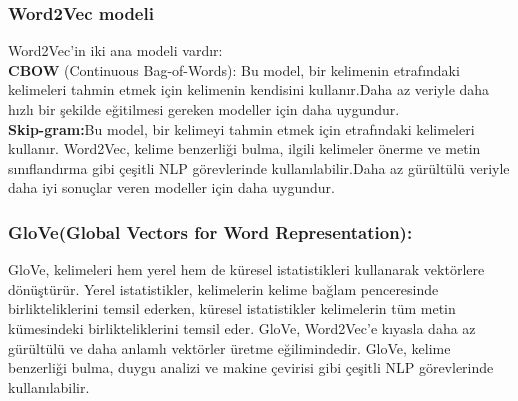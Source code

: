 \documentclass[12pt, a4paper]{article}
\begin{document}
	\subsubsection{Word2Vec modeli}
	Word2Vec'in iki ana modeli vardır:\\
	\textbf{CBOW} (Continuous Bag-of-Words): Bu model, bir kelimenin etrafındaki kelimeleri tahmin etmek için kelimenin kendisini kullanır.Daha az veriyle daha hızlı bir şekilde eğitilmesi gereken modeller için daha uygundur.\\
	\textbf{Skip-gram:}Bu model, bir kelimeyi tahmin etmek için etrafındaki kelimeleri kullanır.
	Word2Vec, kelime benzerliği bulma, ilgili kelimeler önerme ve metin sınıflandırma gibi çeşitli NLP görevlerinde kullanılabilir.Daha az gürültülü veriyle daha iyi sonuçlar veren modeller için daha uygundur.\\
	\subsubsection{GloVe(Global Vectors for Word Representation):}
	GloVe, kelimeleri hem yerel hem de küresel istatistikleri kullanarak vektörlere dönüştürür. Yerel istatistikler, kelimelerin kelime bağlam penceresinde birlikteliklerini temsil ederken, küresel istatistikler kelimelerin tüm metin kümesindeki birlikteliklerini temsil eder.
	GloVe, Word2Vec'e kıyasla daha az gürültülü ve daha anlamlı vektörler üretme eğilimindedir. GloVe, kelime benzerliği bulma, duygu analizi ve makine çevirisi gibi çeşitli NLP görevlerinde kullanılabilir.
	
	
\end{document}
